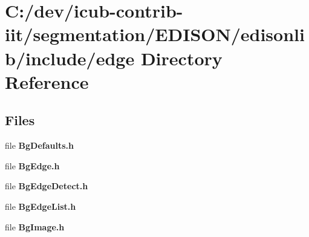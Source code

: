 \section{C\+:/dev/icub-\/contrib-\/iit/segmentation/\+E\+D\+I\+S\+O\+N/edisonlib/include/edge Directory Reference}
\label{dir_acf4b6142e7eaba182fb35455cc1d154}
\subsection*{Files}
\begin{DoxyCompactItemize}
\item 
file {\bfseries Bg\+Defaults.\+h}
\item 
file {\bfseries Bg\+Edge.\+h}
\item 
file {\bfseries Bg\+Edge\+Detect.\+h}
\item 
file {\bfseries Bg\+Edge\+List.\+h}
\item 
file {\bfseries Bg\+Image.\+h}
\end{DoxyCompactItemize}
